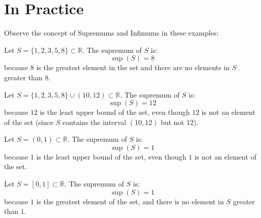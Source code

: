 \documentclass[12pt]{article}
\begin{document}
\section*{In Practice}
Observe the concept of Supremums and Infimums in these examples: 

\noindent 
Let \( S = \{1, 2, 3, 5, 8\} \subset \mathbb{R} \). The supremum of \( S \) is:
\[
\sup(S) = 8
\]
because \( 8 \) is the greatest element in the set and there are no elements in \( S \) greater than \( 8 \).

\noindent 
Let \( S = \{1, 2, 3, 5, 8\} \cup (10, 12) \subset \mathbb{R} \). The supremum of \( S \) is:
\[
\sup(S) = 12
\]
because \( 12 \) is the least upper bound of the set, even though \( 12 \) is not an element of the set (since \( S \) contains the interval \( (10, 12) \) but not \( 12 \)).

\noindent 
Let \( S = (0, 1) \subset \mathbb{R} \). The supremum of \( S \) is:
\[
\sup(S) = 1
\]
because \( 1 \) is the least upper bound of the set, even though \( 1 \) is not an element of the set.

\noindent 
Let \( S = [0, 1] \subset \mathbb{R} \). The supremum of \( S \) is:
\[
\sup(S) = 1
\]
because \( 1 \) is the greatest element of the set, and there is no element in \( S \) greater than \( 1 \).
\end{document}
